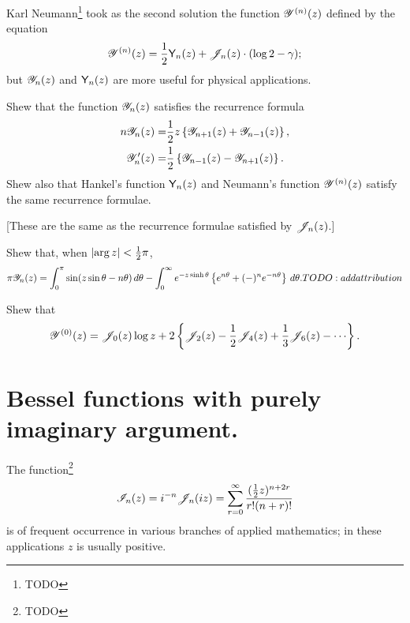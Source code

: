 \documentclass{book}
\begin{document}
  Karl Neumann\footnote{TODO} took as the second solution the function
  $\mathscr{Y}^{(n)}(z)$ defined by the equation
  $$
  \mathscr{Y}^{(n)}(z)
  =
  \frac{1}{2} \mathsf{Y}_n(z) + \mathscr{J}_n(z) \cdot (\log 2 - \gamma);
  $$
  but $\mathscr{Y}_n(z)$ and $\mathsf{Y}_n(z)$ are more useful for physical
  applications.
  \begin{wandwexample}
    Shew that the function $\mathscr{Y}_n(z)$ satisfies the recurrence formula
    \begin{align*}
      n \mathscr{Y}_n(z)
      =& \frac{1}{2} z \left\{  \mathscr{Y}_{n+1}(z) + \mathscr{Y}_{n-1}(z) \right\},
      \\
      \mathscr{Y}_n'(z)
      =& \frac{1}{2} \left\{  \mathscr{Y}_{n-1}(z) - \mathscr{Y}_{n+1}(z)   \right\}.
    \end{align*}
    Shew also that Hankel's function $\mathsf{Y}_n(z)$ and Neumann's
    function $\mathscr{Y}^{(n)}(z)$ satisfy the same recurrence formulae.

    [These are the same as the recurrence formulae satisfied by $\mathscr{J}_n(z)$.]
  \end{wandwexample}
  \begin{wandwexample}
    Shew that, when $\left| \arg z \right| < \frac{1}{2} \pi$,
    $$
    \pi \mathscr{Y}_n(z)
    =
    \int_0^{\pi}
    \sin (z \sin\theta - n\theta) \, d \theta
    -
    \int_0^{\infty}
    e^{-z \sinh\theta} \left\{ e^{n\theta} + (-)^n e^{-n\theta} \right\} \, d\theta.
    TODO:addattribution
    $$
  \end{wandwexample}
  \begin{wandwexample}
    Shew that
    $$
    \besY^{(0)}(z)
    =
    \besJ_0(z) \log z
    + 2 \thebrace{ \besJ_2(z) - \half \besJ_4(z) + \frac{1}{3} \besJ_6(z) - \cdots  }.
    $$
  \end{wandwexample}

\section{Bessel functions with purely imaginary argument.}
The function\footnote{TODO}
$$
\mathscr{I}_n(z)
=
i^{-n}
\mathscr{J}_n(iz)
=
\sum_{r=0}^{\infty}
  \frac{(\frac{1}{2} z)^{n+2r}}{r!(n+r)!}
  $$
  is of frequent occurrence in various branches of applied
  mathematics; in these applications $z$ is usually positive.
\end{document}
